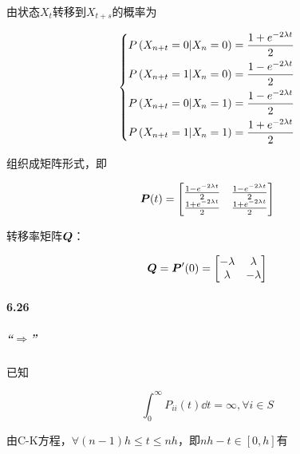 \documentclass{../notes}
\begin{document}
    由状态$X_t$转移到$X_{t+s}$的概率为

    \begin{equation}
        \left\{
        \begin{aligned}
            P\left(X_{n+t} = 0|X_n = 0\right) &= \frac{1 + e^{-2\lambda t}}{2} \\
            P\left(X_{n+t} = 1|X_n = 0\right) &= \frac{1 - e^{-2\lambda t}}{2} \\
            P\left(X_{n+t} = 0|X_n = 1\right) &= \frac{1 - e^{-2\lambda t}}{2} \\
            P\left(X_{n+t} = 1|X_n = 1\right) &= \frac{1 + e^{-2\lambda t}}{2} \\
        \end{aligned}
        \right.
    \end{equation}

    组织成矩阵形式，即

    \begin{equation}
        \boldsymbol P(t) = \begin{bmatrix}
            \frac{1 - e^{-2\lambda t}}2 & \frac{1 - e^{-2\lambda t}}2 \\
            \frac{1 + e^{-2\lambda t}}2 & \frac{1 + e^{-2\lambda t}}2 \\
        \end{bmatrix}
    \end{equation}

    转移率矩阵$\boldsymbol Q$：

    \begin{equation}
        \boldsymbol Q = \boldsymbol P'(0) = \begin{bmatrix}
            -\lambda & \lambda \\
            \lambda & -\lambda \\
        \end{bmatrix}
    \end{equation}

    \paragraph*{6.26}

    \subparagraph*{“$\Rightarrow$”} 已知

    \begin{equation}
        \int _0^\infty P_{ii}(t)\dd t = \infty, \forall i\in S
    \end{equation}

    由C-K方程，$\forall (n-1)h\leq t \leq nh$，即$nh-t\in [0, h]$有
\end{document}
